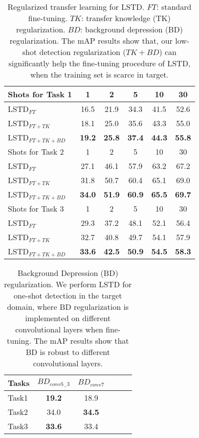 \documentclass[letterpaper]{article} \usepackage{aaai18}  \usepackage{times}  \usepackage{helvet}  \usepackage{courier}  \usepackage{url}  \usepackage{graphicx}
\begin{document}
\begin{table}[t]
\centering
\begin{tabular}{l|ccccc}
\hline
Shots for Task 1 & 1 & 2 & 5 & 10 & 30  \\
\hline
LSTD$_{FT}$ &  16.5 & 21.9 & 34.3 & 41.5 & 52.6 \\
LSTD$_{FT + TK}$ & 18.1 & 25.0 & 35.6 & 43.3 & 55.0 \\
LSTD$_{FT + TK + BD}$ & \textbf{19.2} & \textbf{25.8} & \textbf{37.4} & \textbf{44.3} & \textbf{55.8} \\
\hline
Shots for Task 2 & 1 & 2 & 5 & 10 & 30  \\
\hline
LSTD$_{FT}$& 27.1 & 46.1 & 57.9 & 63.2 & 67.2 \\
LSTD$_{FT + TK}$ & 31.8 & 50.7 & 60.4 & 65.1 & 69.0 \\
LSTD$_{FT + TK + BD}$ & \textbf{34.0} & \textbf{51.9} & \textbf{60.9} & \textbf{65.5} & \textbf{69.7} \\
\hline
Shots for Task 3 & 1 & 2 & 5 & 10 & 30  \\
\hline
LSTD$_{FT}$& 29.3 & 37.2  & 48.1 & 52.1 & 56.4 \\
LSTD$_{FT + TK}$ & 32.7 & 40.8 & 49.7 & 54.1 & 57.9 \\
LSTD$_{FT + TK + BD}$ & \textbf{33.6} & \textbf{42.5} & \textbf{50.9} & \textbf{54.5} & \textbf{58.3} \\
\hline
\end{tabular}
\caption{Regularized transfer learning for LSTD.
$FT$: standard fine-tuning.
$TK$: transfer knowledge (TK) regularization.
$BD$: background depression (BD) regularization.
The mAP results show that,
our low-shot detection regularization ($TK+BD$) can significantly help the fine-tuning procedure of LSTD,
when the training set is scarce in target.}
\label{LSTDTransfer}
\end{table}


\begin{table}[t]
\centering
\begin{tabular}{l|ccccc}
\hline
Tasks & $BD_{conv5_{-}3}$ & $BD_{conv7}$  \\
\hline
Task1 & \textbf{19.2}  & 18.9 \\
Task2 & 34.0  & \textbf{34.5}  \\
Task3 & \textbf{33.6}  & 33.4 \\
\hline
\end{tabular}
\caption{Background Depression (BD) regularization.
We perform LSTD for one-shot detection in the target domain,
where
BD regularization is implemented on different convolutional layers when fine-tuning.
The mAP results show that BD is robust to different convolutional layers.}
\label{BDdiffconv}
\end{table}
\end{document}
